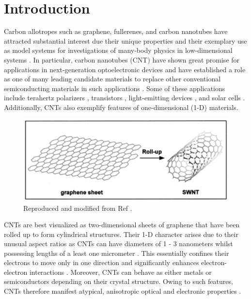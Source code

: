 \chapter{Introduction}

Carbon allotropes such as graphene, fullerenes, and carbon nanotubes have attracted substantial interest due their unique properties and their exemplary use as model systems for investigations of many-body physics in low-dimensional systems \cite{zaytseva2016carbon, nanot2012optoelectronic, soavi2016ultrafast}. In particular, carbon nanotubes (CNT) have shown great promise for applications in next-generation optoelectronic devices and have established a role as one of many leading candidate materials to replace other conventional semiconducting materials in such applications \cite{nanot2012optoelectronic}. Some of these applications include terahertz polarizers \cite{ren2009carbon}, transistors \cite{qiu2017scaling}, light-emitting devices \cite{liu2015electrically}, and solar cells \cite{kongkanand2007single}. Additionally, CNTs also exemplify features of one-dimensional (1-D) materials. 

\begin{figure}[H]
	\centering
	\includegraphics[scale=0.8]{images/chapter_intro/rolled_up_graphene.png}
	\caption{Reproduced and modified from Ref \cite{odom2000structure}.}
\end{figure}

CNTs are best visualized as two-dimensional sheets of graphene that have been rolled up to form cylindrical structures. Their 1-D character arises due to their unusual aspect ratios as CNTs can have diameters of 1 - 3 nanometers whilst possessing lengths of a least one micrometer  \cite{zaytseva2016carbon, ando1997excitons}. This essentially confines their electrons to move only in one direction and significantly enhances electron-electron interactions \cite{ando1997excitons}. Moreover, CNTs can behave as either metals or semiconductors depending on their crystal structure. Owing to such features, CNTs therefore manifest atypical, anisotropic optical and electronic properties \cite{weismanKonoBook}. 

